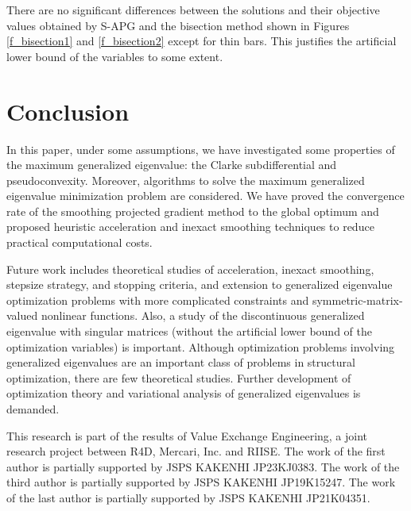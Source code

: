 \documentclass[sn-mathphys,Numbered]{sn-jnl}%
\theoremstyle{thmstyleone}%
\theoremstyle{thmstyletwo}%
\theoremstyle{thmstylethree}%
\begin{document}
There are no significant differences between the solutions and their objective values obtained by S-APG and the bisection method shown in Figures \ref{f_bisection1} and \ref{f_bisection2} except for thin bars. This justifies the artificial lower bound of the variables to some extent.

\section{Conclusion}

In this paper, under some assumptions, we have investigated some properties of the maximum generalized eigenvalue: the Clarke subdifferential and pseudoconvexity. Moreover, algorithms to solve the maximum generalized eigenvalue minimization problem are considered. We have proved the convergence rate of the smoothing projected gradient method to the global optimum and proposed heuristic acceleration and inexact smoothing techniques to reduce practical computational costs.

Future work includes theoretical studies of acceleration, inexact smoothing, stepsize strategy, and stopping criteria, and extension to generalized eigenvalue optimization problems with more complicated constraints and symmetric-matrix-valued nonlinear functions. Also, a study of the discontinuous generalized eigenvalue with singular matrices (without the artificial lower bound of the optimization variables) is important. Although optimization problems involving generalized eigenvalues are an important class of problems in structural optimization, there are few theoretical studies. Further development of optimization theory and variational analysis of generalized eigenvalues is demanded.

\backmatter


This research is part of the results of Value Exchange Engineering, a joint research project between R4D, Mercari, Inc. and RIISE. The work of the first author is partially supported by JSPS KAKENHI JP23KJ0383. The work of the third author is partially supported by JSPS KAKENHI JP19K15247. The work of the last author is partially supported by JSPS KAKENHI JP21K04351.
\end{document}
